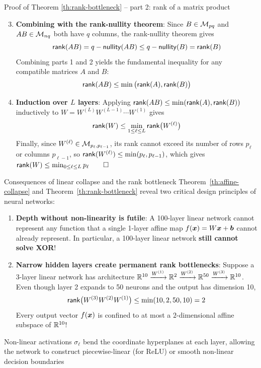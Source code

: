 \documentclass[aspectratio=169]{beamer}\usepackage[]{graphicx}\usepackage[]{xcolor}
\begin{document}
\begin{frame}[importantcolour]{Proof of Theorem \ref{th:rank-bottleneck} -- part 2: rank of a matrix product}
\begin{enumerate}
\setcounter{enumi}{2}
\item \textbf{Combining with the rank-nullity theorem}:
Since $B \in \mathcal{M}_{pq}$ and $AB \in \mathcal{M}_{nq}$ both have $q$ columns, the rank-nullity theorem gives
\[
\mathsf{rank}(AB) = q - \mathsf{nullity}(AB) \le q - \mathsf{nullity}(B) = \mathsf{rank}(B)
\]
Combining parts 1 and 2 yields the fundamental inequality for any compatible matrices $A$ and $B$:
\[
\mathsf{rank}(AB) \le \min\big(\mathsf{rank}(A), \mathsf{rank}(B)\big)
\]
\vfill
\item \textbf{Induction over $L$ layers}:
Applying $\mathsf{rank}(AB) \le \min(\mathsf{rank}(A), \mathsf{rank}(B))$ inductively to $W = W^{(L)} W^{(L-1)} \cdots W^{(1)}$ gives
\[
\mathsf{rank}(W) \le \min_{1 \le \ell \le L} \mathsf{rank}\big(W^{(\ell)}\big)
\]
Finally, since $W^{(\ell)} \in \mathcal{M}_{p_\ell, p_{\ell-1}}$, its rank cannot exceed its number of rows $p_\ell$ or columns $p_{\ell-1}$, so $\mathsf{rank}(W^{(\ell)}) \le \min(p_\ell, p_{\ell-1})$, which gives $\mathsf{rank}(W) \le \min_{0 \le \ell \le L} p_\ell \qed$
\end{enumerate}
\end{frame}


\begin{frame}{Consequences of linear collapse and the rank bottleneck}
Theorem~\ref{th:affine-collapse} and Theorem~\ref{th:rank-bottleneck} reveal two critical design principles of neural networks:
\vfill
\begin{enumerate}
\item \textbf{Depth without non-linearity is futile}:
A 100-layer linear network cannot represent any function that a single 1-layer affine map $f(\bm{x}) = W\bm{x} + \bm{b}$ cannot already represent. In particular, a 100-layer linear network \textbf{still cannot solve XOR}!
\vfill
\item \textbf{Narrow hidden layers create permanent rank bottlenecks}:
Suppose a 3-layer linear network has architecture $\mathbb{R}^{10} \xrightarrow{W^{(1)}} \mathbb{R}^2 \xrightarrow{W^{(2)}} \mathbb{R}^{50} \xrightarrow{W^{(3)}} \mathbb{R}^{10}$. Even though layer 2 expands to 50 neurons and the output has dimension 10,
\[
\mathsf{rank}\big(W^{(3)} W^{(2)} W^{(1)}\big) \le \min(10, 2, 50, 10) = 2
\]
Every output vector $f(\bm{x})$ is confined to at most a $2$-dimensional affine subspace of $\mathbb{R}^{10}$!
\end{enumerate}
\vfill
Non-linear activations $\sigma_\ell$ bend the coordinate hyperplanes at each layer, allowing the network to construct piecewise-linear (for ReLU) or smooth non-linear decision boundaries
\end{frame}
\end{document}
